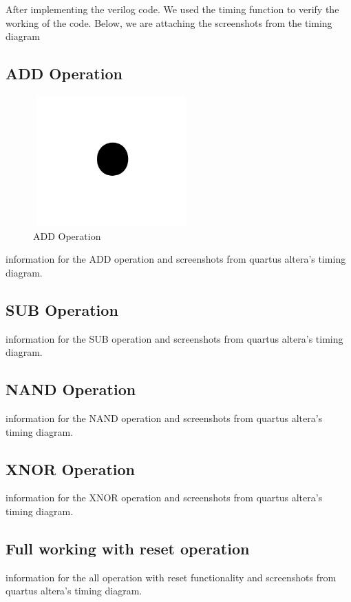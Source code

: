 After implementing the verilog code.
We used the timing function to verify the working of the code.
Below, we are attaching the screenshots from the timing diagram

\subsection{ADD Operation}\label{subsec:add-operation}

\begin{figure}[htbp]
    \centerline{\includegraphics[height=5cm,width=6cm]{figures/fig1}}
    \caption{ADD Operation}
    \label{fig:add}
\end{figure}

information for the ADD operation and screenshots from quartus altera's timing diagram.

\subsection{SUB Operation}\label{subsec:sub-operation}

information for the SUB operation and screenshots from quartus altera's timing diagram.

\subsection{NAND Operation}\label{subsec:nand-operation}

information for the NAND operation and screenshots from quartus altera's timing diagram.

\subsection{XNOR Operation}\label{subsec:xnor-operation}

information for the XNOR operation and screenshots from quartus altera's timing diagram.

\subsection{Full working with reset operation}\label{subsec:full-working-with-reset-operation}

information for the all operation with reset functionality and screenshots from quartus altera's timing diagram.
